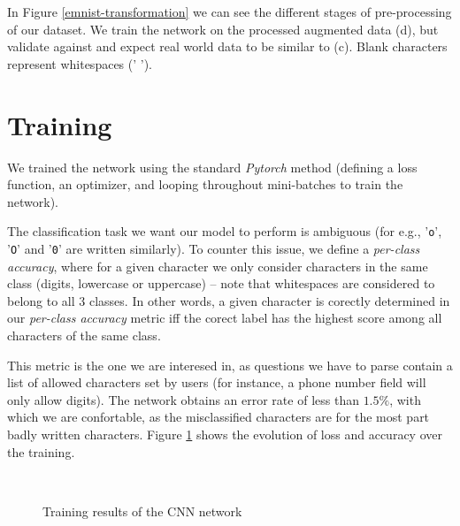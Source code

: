 \documentclass[11pt, a4paper]{report}
\def\code#1{\texttt{#1}}
\begin{document}
In Figure \ref{emnist-transformation} we can see the different stages of pre-processing of our dataset. We train the network on the processed augmented data (d), but validate against and expect real world data to be similar to (c). Blank characters represent whitespaces (' ').

\section{Training}

We trained the network using the standard \textit{Pytorch} method (defining a loss function, an optimizer, and looping throughout mini-batches to train the network).

The classification task we want our model to perform is ambiguous (for e.g., '\code{o}', '\code{O}' and '\code{0}' are written similarly). To counter this issue, we define a \textit{per-class accuracy}, where for a given character we only consider characters in the same class (digits, lowercase or uppercase) -- note that whitespaces are considered to belong to all $3$ classes. In other words, a given character is corectly determined in our \textit{per-class accuracy} metric iff the corect label has the highest score among all characters of the same class.

This metric is the one we are interesed in, as questions we have to parse contain a list of allowed characters set by users (for instance, a phone number field will only allow digits). The network obtains an error rate of less than $1.5\%$, with which we are confortable, as the misclassified characters are for the most part badly written characters. Figure \ref{ocr-results} shows the evolution of loss and accuracy over the training. 


\begin{figure}[!h]
	\begin{center}
		\\
	\end{center}
	\caption{Training results of the CNN network}
	\label{ocr-results}
\end{figure}
\end{document}
